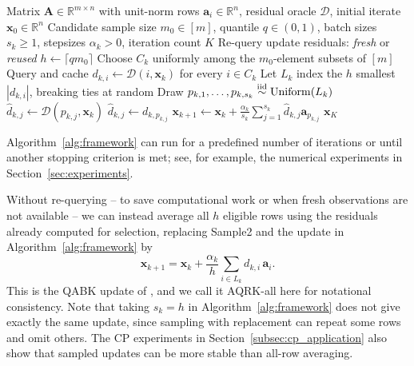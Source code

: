 \documentclass[pdflatex,sn-mathphys-num]{sn-jnl}
\theoremstyle{thmstyleone}
\theoremstyle{thmstylethree}
\newcommand{\mA}{\mathbf{A}}
\newcommand{\vx}{\mathbf{x}}
\newcommand{\va}{\mathbf{a}}
\begin{document}
\begin{algorithm}[H]
\caption{AQRK sampled, with or without re-querying}
\label{alg:framework}
\begin{algorithmic}[1]
\Require Matrix $\mA\in\mathbb R^{m\times n}$ with unit-norm rows $\va_i\in\mathbb R^n$, residual oracle $\mathcal D$, initial iterate $\vx_0\in\mathbb R^n$
\Require Candidate sample size $m_0\in[m]$, quantile $q\in(0,1)$, batch sizes $s_k\ge1$, stepsizes $\alpha_k>0$, iteration count $K$
\Require Re-query update residuals: \emph{fresh} or \emph{reused}
\State $h\gets\lceil qm_0\rceil$
    \State Choose $C_k$ uniformly among the $m_0$-element subsets of $[m]$ 
    \State Query and cache $d_{k,i}\gets\mathcal D(i,\vx_k)$ for every $i\in C_k$
    \State Let $L_k$ index the $h$ smallest $|d_{k,i}|$, breaking ties at random 
    \State Draw $p_{k,1},\ldots,p_{k,s_k}\stackrel{\rm iid}{\sim}\mathrm{Uniform}(L_k)$ 
            \State $\widehat d_{k,j}\gets\mathcal D(p_{k,j},\vx_k)$ 
        \Else
            \State $\widehat d_{k,j}\gets d_{k,p_{k,j}}$
        \EndIf
    \EndFor
    \State $\displaystyle \vx_{k+1}\gets\vx_k+\frac{\alpha_k}{s_k}\sum_{j=1}^{s_k}\widehat d_{k,j}\va_{p_{k,j}}$ 
\EndFor
\State \Return $\vx_K$
\end{algorithmic}
\end{algorithm}

Algorithm~\ref{alg:framework} can run for a predefined number of iterations
or until another stopping criterion is met; see, for example, the numerical
experiments in Section~\ref{sec:experiments}.

Without re-querying -- to save computational work or when fresh observations
are not available -- we can instead average all $h$ eligible rows using the
residuals already computed for selection, replacing Sample2 and the update in
Algorithm~\ref{alg:framework} by
\begin{equation}
\label{eq:aqrk-all}
    \vx_{k+1}=\vx_k+\frac{\alpha_k}{h}\sum_{i\in L_k}d_{k,i}\,\va_i .
\end{equation}
This is the QABK update of \cite{cheng2022block}, and we call it AQRK-all
here for notational consistency. Note that taking $s_k=h$ in
Algorithm~\ref{alg:framework} does not give exactly the same update, since
sampling with replacement can repeat some rows and omit others. The CP
experiments in Section~\ref{subsec:cp_application} also show that sampled
updates can be more stable than all-row averaging.
\end{document}
